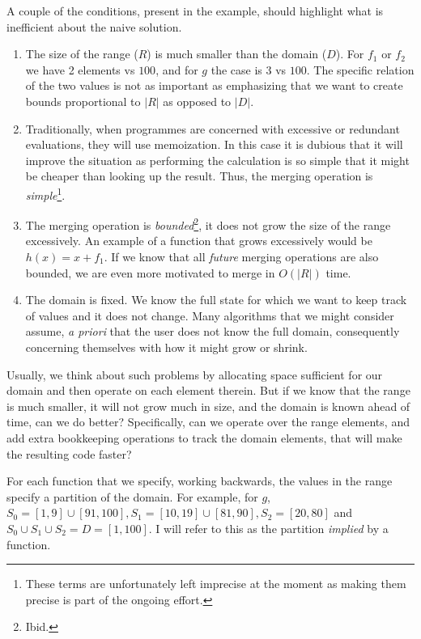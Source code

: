 \documentclass{article}
\begin{document}
A couple of the conditions,
present in the example,
should highlight what is inefficient about the naive solution.
\begin{enumerate}
  \item The size of the range ($R$) is much smaller than the domain ($D$).
    For $f_{1}$ or $f_{2}$ we have 2 elements vs $100$,
    and for $g$ the case is $3$ vs $100$.
    The specific relation of the two values is not as important as emphasizing
    that we want to create bounds proportional to $|R|$ as opposed to $|D|$.

  \item Traditionally,
    when programmes are concerned with excessive or redundant evaluations,
    they will use memoization.
    In this case it is dubious that it will improve the situation as
    performing the calculation
    is so simple that it might be cheaper than looking up the result.
    Thus, the merging operation is \emph{simple}\footnote{
      These terms are unfortunately left imprecise at the moment as making
      them precise is part of the ongoing effort.}.

  \item The merging operation is \emph{bounded}\footnote{Ibid.},
    it does not grow the size of the range excessively.
    An example of a function that grows excessively would be $h(x) = x + f_{1}$.
    If we know that all \emph{future} merging operations are also bounded,
    we are even more motivated to merge in $O(|R|)$ time.

  \item The domain is fixed.
    We know the full state for which we want to keep track of values and it
    does not change.
    Many algorithms that we might consider assume, \emph{a priori} that the
    user does not know the full domain,
    consequently concerning themselves with how it might grow or shrink.

\end{enumerate}

Usually,
we think about such problems by allocating space sufficient for our domain
and then operate on each element therein.
But if we know that the range is much smaller,
it will not grow much in size,
and the domain is known ahead of time,
can we do better?
Specifically,
can we operate over the range elements,
and add extra bookkeeping operations to track the domain elements,
that will make the resulting code faster?

For each function that we specify,
working backwards,
the values in the range specify a partition of the domain.
For example,
for $g$, $S_{0} = [1,9]\cup [91,100], S_{1} = [10,19] \cup [81,90], S_{2} = [20,80]$
and $S_{0} \cup S_{1} \cup S_{2} = D = [1,100]$.
I will refer to this as the partition \emph{implied} by a function.
\end{document}
